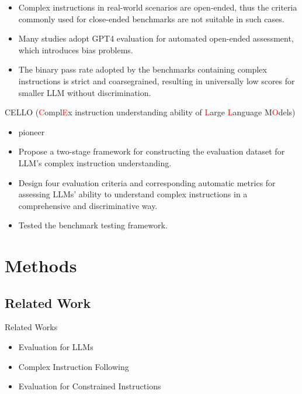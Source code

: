 \documentclass{beamer}
\begin{document}
\begin{frame}
    \begin{itemize}
        \item {Complex instructions in real-world scenarios are open-ended, thus the criteria commonly used for close-ended benchmarks are not suitable in such cases.}
        \item {Many studies adopt GPT4 evaluation for automated open-ended assessment, which introduces bias problems.}
        \item {The binary pass rate adopted by the benchmarks containing complex instructions is strict and coarsegrained, resulting in universally low scores for smaller LLM without discrimination.}
    \end{itemize}
\end{frame}

\begin{frame}{CELLO (\textcolor{red}{C}ompl\textcolor{red}{E}x instruction understanding ability of \textcolor{red}{L}arge \textcolor{red}{L}anguage M\textcolor{red}{O}dels)}
    \begin{itemize}
        \item {pioneer}
        \item {Propose a two-stage framework for constructing the evaluation dataset for LLM's complex instruction understanding.}
        \item {Design four evaluation criteria and corresponding automatic metrics for assessing LLMs' ability to understand complex instructions in a comprehensive and discriminative way.}
        \item {Tested the benchmark testing framework.}
    \end{itemize}
\end{frame}

\section{Methods}

\subsection{Related Work}

\begin{frame}{Related Works}
    \begin{itemize}
        \item {Evaluation for LLMs}
        \item {Complex Instruction Following}
        \item {Evaluation for Constrained Instructions}
    \end{itemize}
\end{frame}
\end{document}
